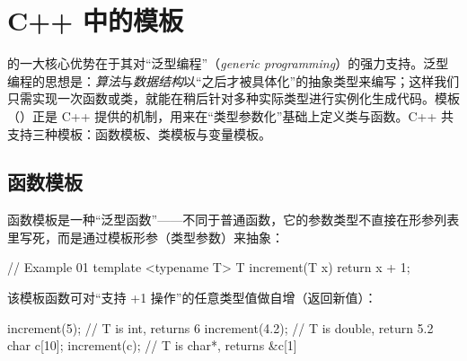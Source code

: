 \section{C++ 中的模板}

\cppsign{} 的一大核心优势在于其对“泛型编程”（\emph{generic programming}）的强力支持。泛型编程的思想是：\emph{算法}与\emph{数据结构}以“之后才被具体化”的抽象类型来编写；这样我们只需实现一次函数或类，就能在稍后针对多种实际类型进行实例化生成代码。模板（）正是 C++ 提供的机制，用来在“类型参数化”基础上定义类与函数。C++ 共支持三种模板：函数模板、类模板与变量模板。

\subsection{函数模板}

函数模板是一种“泛型函数”——不同于普通函数，它的参数类型不直接在形参列表里写死，而是通过模板形参（类型参数）来抽象：

\begin{code}
// Example 01
template <typename T>
T increment(T x) { return x + 1; }
\end{code}

该模板函数可对“支持 +1 操作”的任意类型值做自增（返回新值）：

\begin{code}
increment(5);    // T is int, returns 6
increment(4.2);  // T is double, return 5.2 
char c[10];
increment(c);    // T is char*, returns &c[1]
\end{code}

